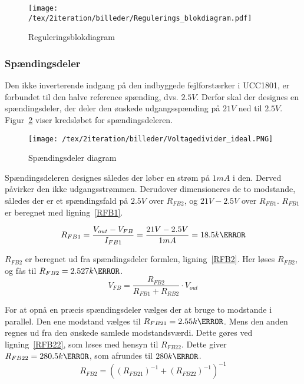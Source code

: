 \begin{figure}[H]
	\center
	\texttt{[image: /tex/2iteration/billeder/Regulerings\_blokdiagram.pdf]}
	\caption{Reguleringsblokdiagram}
	\label{fig:regulerings_blokdiagram}
\end{figure}

\subsubsection{Spændingsdeler}
Den ikke inverterende indgang på den indbyggede fejlforstærker i UCC1801, er forbundet til den halve reference spænding, dvs. $2.5V$. Derfor skal der designes en spændingsdeler, der deler den ønskede udgangsspænding på $21V$ ned til $2.5V$. Figur~\ref{fig:Voltagedivider_ideal} viser kredsløbet for spændingsdeleren. 

\begin{figure}[H]
	\center
	\texttt{[image: /tex/2iteration/billeder/Voltagedivider\_ideal.PNG]}
	\caption{Spændingsdeler diagram}
	\label{fig:Voltagedivider_ideal}
\end{figure}

Spændingsdeleren designes således der løber en strøm på $1mA$ i den. Derved påvirker den ikke udgangsstrømmen. Derudover dimensioneres de to modstande, således der er et spændingsfald på $2.5V$ over $R_{FB2}$, og $21V-2.5V$ over $R_{FB1}$. $R_{FB1}$ er beregnet med ligning~\ref{RFB1}.

\begin{equation} \label{RFB1}
R_{FB1} = \frac{V_{out}-V_{FB}}{I_{FB1}} = \frac{21V-2.5V}{1mA} = 18.5k\ohm
\end{equation}

\noindent $R_{FB2}$ er beregnet ud fra spændingsdeler formlen, ligning~\ref{RFB2}. Her løses $R_{FB2}$, og fås til $R_{FB2}=2.527k \ohm$.  
\begin{equation} \label{RFB2}
V_{FB} = \frac{R_{FB2}}{R_{FB1} + R_{RB2}} \cdot V_{out}
\end{equation}

For at opnå en præcis spændingsdeler vælges der at bruge to modstande i parallel. Den ene modstand vælges til $R_{FB21}=2.55k\ohm$. Mens den anden regnes ud fra den ønskede samlede modstandsværdi. Dette gøres ved ligning~\ref{RFB22}, som løses med hensyn til $R_{FB22}$. Dette giver $R_{FB22}=280.5k\ohm$, som afrundes til $280k\ohm$.
\begin{equation} \label{RFB22}
R_{FB2} = ((R_{FB21})^{-1} + (R_{FB22})^{-1})^{-1}
\end{equation}

